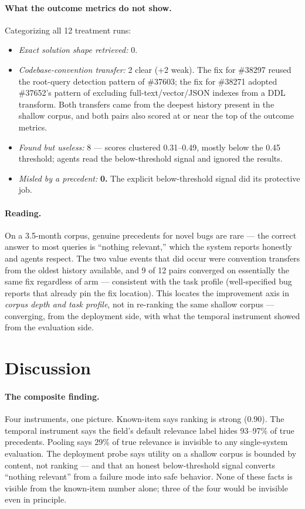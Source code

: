 \documentclass[sigconf,nonacm]{acmart}
\begin{document}
\paragraph{What the outcome metrics do not show.}
Categorizing all 12 treatment runs:
\begin{itemize}
  \item \emph{Exact solution shape retrieved:} 0.
  \item \emph{Codebase-convention transfer:} 2 clear (+2 weak). The fix
    for \#38297 reused the root-query detection pattern of \#37603; the
    fix for \#38271 adopted \#37652's pattern of excluding
    full-text/vector/JSON indexes from a DDL transform. Both transfers
    came from the deepest history present in the shallow corpus, and both
    pairs also scored at or near the top of the outcome metrics.
  \item \emph{Found but useless:} 8 --- scores clustered 0.31--0.49,
    mostly below the 0.45 threshold; agents read the below-threshold
    signal and ignored the results.
  \item \emph{Misled by a precedent:} \textbf{0.} The explicit
    below-threshold signal did its protective job.
\end{itemize}

\paragraph{Reading.}
On a 3.5-month corpus, genuine precedents for novel bugs are rare --- the
correct answer to most queries is ``nothing relevant,'' which the system
reports honestly and agents respect. The two value events that did occur
were convention transfers from the oldest history available, and 9 of 12
pairs converged on essentially the same fix regardless of arm ---
consistent with the task profile (well-specified bug reports that already
pin the fix location). This locates the improvement axis in \emph{corpus
depth and task profile}, not in re-ranking the same shallow corpus ---
converging, from the deployment side, with what the temporal instrument
showed from the evaluation side.

\section{Discussion}
\label{sec:discussion}

\paragraph{The composite finding.}
Four instruments, one picture. Known-item says ranking is strong (0.90).
The temporal instrument says the field's default relevance label hides
93--97\% of true precedents. Pooling says 29\% of true relevance is
invisible to any single-system evaluation. The deployment probe says
utility on a shallow corpus is bounded by content, not ranking --- and
that an honest below-threshold signal converts ``nothing relevant'' from
a failure mode into safe behavior. None of these facts is visible from
the known-item number alone; three of the four would be invisible even in
principle.
\end{document}
